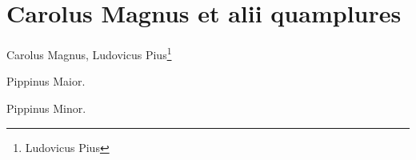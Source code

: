 \documentclass{scrbook}
\begin{document}
\chapter{Carolus Magnus et alii quamplures}
Carolus Magnus, 
Ludovicus Pius\footnote{Ludovicus Pius}

\begin{pairs}

\begin{Leftside}
\beginnumbering
\pstart
Pippinus Maior.
\pend
\endnumbering
\end{Leftside}

\begin{Rightside}
\beginnumbering
\pstart
Pippinus Minor.
\pend
\endnumbering
\end{Rightside}

\end{pairs}
\Columns

\printindex
\end{document}

